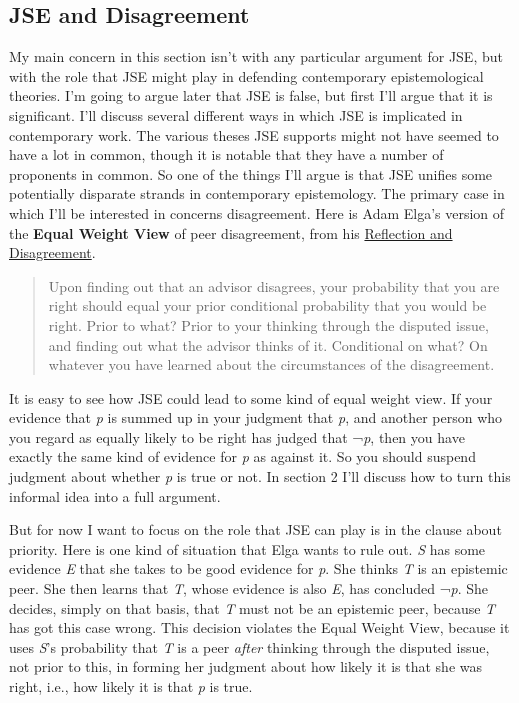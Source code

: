 \documentclass[
  11pt,
  letterpaper,
  DIV=11,
  numbers=noendperiod,
  twoside]{scrartcl}
\begin{document}
\subsection{JSE and Disagreement}\label{jse-and-disagreement}

My main concern in this section isn't with any particular argument for
JSE, but with the role that JSE might play in defending contemporary
epistemological theories. I'm going to argue later that JSE is false,
but first I'll argue that it is significant. I'll discuss several
different ways in which JSE is implicated in contemporary work. The
various theses JSE supports might not have seemed to have a lot in
common, though it is notable that they have a number of proponents in
common. So one of the things I'll argue is that JSE unifies some
potentially disparate strands in contemporary epistemology. The primary
case in which I'll be interested in concerns disagreement. Here is Adam
Elga's version of the \textbf{Equal Weight View} of peer disagreement,
from his
\href{http://philsci-archive.pitt.edu/archive/00002940/}{Reflection and
Disagreement}.

\begin{quote}
Upon finding out that an advisor disagrees, your probability that you
are right should equal your prior conditional probability that you would
be right. Prior to what? Prior to your thinking through the disputed
issue, and finding out what the advisor thinks of it. Conditional on
what? On whatever you have learned about the circumstances of the
disagreement.
\end{quote}

It is easy to see how JSE could lead to some kind of equal weight view.
If your evidence that \emph{p} is summed up in your judgment that
\emph{p}, and another person who you regard as equally likely to be
right has judged that ¬\emph{p}, then you have exactly the same kind of
evidence for \emph{p} as against it. So you should suspend judgment
about whether \emph{p} is true or not. In section 2 I'll discuss how to
turn this informal idea into a full argument.

But for now I want to focus on the role that JSE can play is in the
clause about priority. Here is one kind of situation that Elga wants to
rule out. \emph{S} has some evidence \emph{E} that she takes to be good
evidence for \emph{p}. She thinks \emph{T} is an epistemic peer. She
then learns that \emph{T}, whose evidence is also \emph{E}, has
concluded ¬\emph{p}. She decides, simply on that basis, that \emph{T}
must not be an epistemic peer, because \emph{T} has got this case wrong.
This decision violates the Equal Weight View, because it uses \emph{S}'s
probability that \emph{T} is a peer \emph{after} thinking through the
disputed issue, not prior to this, in forming her judgment about how
likely it is that she was right, i.e., how likely it is that \emph{p} is
true.
\end{document}
